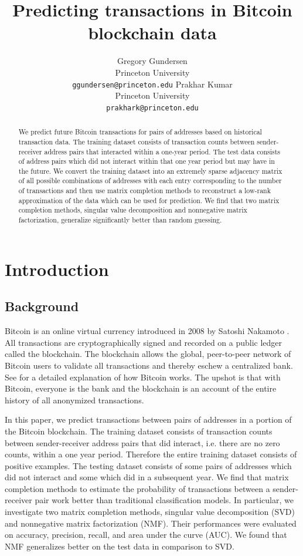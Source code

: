 \documentclass{article} %
\title{Predicting transactions in Bitcoin blockchain data}
\author{
Gregory Gundersen\\
Princeton University\\
\texttt{ggundersen@princeton.edu}
\And
Prakhar Kumar \\
Princeton University \\
\texttt{prakhark@princeton.edu} \\
}
\begin{document}
\maketitle

\begin{abstract}
We predict future Bitcoin transactions for pairs of addresses based on historical transaction data. The training dataset consists of transaction counts between sender-receiver address pairs that interacted within a one-year period. The test data consists of address pairs which did not interact within that one year period but may have in the future. We convert the training dataset into an extremely sparse adjacency matrix of all possible combinations of addresses with each entry corresponding to the number of transactions and then use matrix completion methods to reconstruct a low-rank approximation of the data which can be used for prediction. We find that two matrix completion methods, singular value decomposition and nonnegative matrix factorization, generalize significantly better than random guessing.
\end{abstract}

\section{Introduction}

\subsection{Background}

Bitcoin is an online virtual currency introduced in 2008 by Satoshi Nakamoto \cite{nakamoto2008bitcoin}. All transactions are cryptographically signed and recorded on a public ledger called the blockchain. The blockchain allows the global, peer-to-peer network of Bitcoin users to validate all transactions and thereby eschew a centralized bank. See \cite{nielsen2013bitcoin} for a detailed explanation of how Bitcoin works. The upshot is that with Bitcoin, everyone is the bank and the blockchain is an account of the entire history of all anonymized transactions.

In this paper, we predict transactions between pairs of addresses in a portion of the Bitcoin blockchain. The training dataset consists of transaction counts between sender-receiver address pairs that did interact, i.e. there are no zero counts, within a one year period. Therefore the entire training dataset consists of positive examples. The testing dataset consists of some pairs of addresses which did not interact and some which did in a subsequent year. We find that matrix completion methods to estimate the probability of transactions between a sender-receiver pair work better than traditional classification models. In particular, we investigate two matrix completion methods, singular value decomposition (SVD) and nonnegative matrix factorization (NMF). Their performances were evaluated on accuracy, precision, recall, and area under the curve (AUC). We found that NMF generalizes better on the test data in comparison to SVD.
\end{document}
